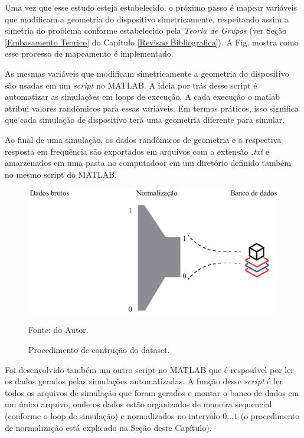 Uma vez que esse estudo esteja estabelecido, o próximo passo é mapear variáveis que modificam a geometria do dispositivo simetricamente, respeitando assim a simetria do problema conforme estabelecido pela \textit{Teoria de Grupos} (ver Seção \ref{Embasamento Teorico} do Capítulo \ref{Revisao Bibliografica}). A Fig. mostra como esse processo de mapeamento é implementado. 

As mesmas variáveis que modificam simetricamente a geometria do dispositivo são usadas em um \textit{script} no MATLAB. A ideia por trás desse script é automatizar as simulações em loops de execução. A cada execução o matlab atribui valores randômicos para essas variáveis. Em termos práticos, isso significa que cada simulação de dispositivo terá uma geometria diferente para simular.


Ao final de uma simulação, os dados randômicos de geometria e a respectiva resposta em frequência são exportados em arquivos com a extensão \textit{.txt} e amarzenados em uma pasta no computadoor em um diretório definido também no mesmo script do MATLAB.

\begin{figure}[H]
    \centering
    \includegraphics{04-Figuras/DatasetMounting.eps}
    \caption{Procedimento de contrução do dataset.} \par
    Fonte: do Autor.
    \label{figura: DatasetMounting}
\end{figure}

Foi desenvolvido também um outro script no MATLAB que é resposável por ler os dados gerados pelas simulações automatizadas. A função desse \textit{script} é ler todos os arquivos de simulação que foram gerados e montar o banco de dados em um único arquivo, onde os dados estão organizados de maneira sequencial (conforme o loop de simulação) e normalizados no intervalo $0\dotso 1$ (o procedimento de normalização está explicado na Seção deste Capítulo).

